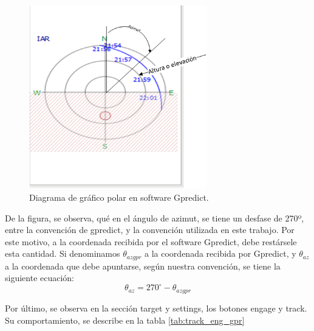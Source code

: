 \begin{figure}[ht]
	\centering
	\includegraphics[height=8cm]{polar_plot}
	\caption{Diagrama de gráfico polar en software Gpredict.} 
	\label{fig:polar_plot_expl}
\end{figure}

De la figura, se observa, qué en el ángulo de azimut, se tiene un desfase de 270º, entre la convención de gpredict, y la convención utilizada en este trabajo. Por este motivo, a la coordenada recibida por el software Gpredict, debe restársele esta cantidad. Si denominamos $\theta_{azgpr}$ a la coordenada recibida por Gpredict, y $\theta_{az}$ a la coordenada que debe apuntarse, según nuestra convención, se tiene la siguiente ecuación:
\begin{equation}
	\theta_{az} =270^\circ - \theta_{azgpr}
\end{equation}

Por último, se observa en la sección target y settings, los botones engage y track. Su comportamiento, se describe en la tabla \ref{tab:track_eng_gpr}

